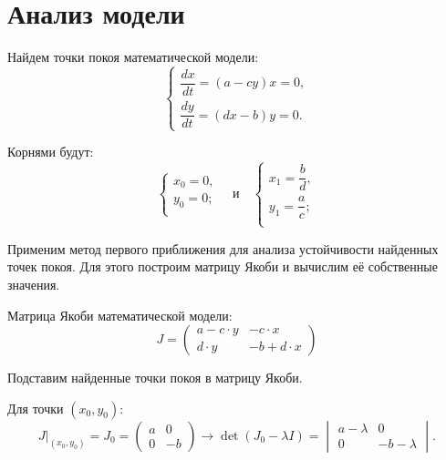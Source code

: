 \pagebreak

\section{Анализ модели}
	Найдем точки покоя математической модели:
	\begin{equation*}
		\begin{cases}
			\dfrac{dx}{dt} = (a - cy)x = 0, \\
			\dfrac{dy}{dt} = (dx - b)y = 0.
		\end{cases}
	\end{equation*}

	Корнями будут:
	\begin{equation}
		\begin{cases}
			x_0 = 0,\\
			y_0 = 0;\\
		\end{cases} 
		\quad \text{и} \quad
		\begin{cases}
			x_1 = \dfrac{b}{d},\\
			y_1 = \dfrac{a}{c};\\
		\end{cases}
	\end{equation}
		 

	Применим метод первого приближения для анализа устойчивости найденных точек покоя. Для этого построим матрицу Якоби и вычислим её собственные значения.

	Матрица Якоби математической модели:
	\begin{equation*}
		J = \begin{pmatrix}
			a - c \cdot y & -c \cdot x \\
			d \cdot y 	  & -b + d \cdot x
		\end{pmatrix}
	\end{equation*}

	Подставим найденные точки покоя в матрицу Якоби. 

	Для точки \( (x_0, y_0) \):
	\begin{equation*}
		J|_{(x_0, y_0)}  = J_0 = 
		\begin{pmatrix}
			 a & 0 \\
			 0 & -b
		\end{pmatrix} 
		\rightarrow 
		\det (J_0 - \lambda I ) = 
		\begin{vmatrix}
			 a - \lambda & 0 \\
			 0 & -b - \lambda
		\end{vmatrix} .
	\end{equation*}

